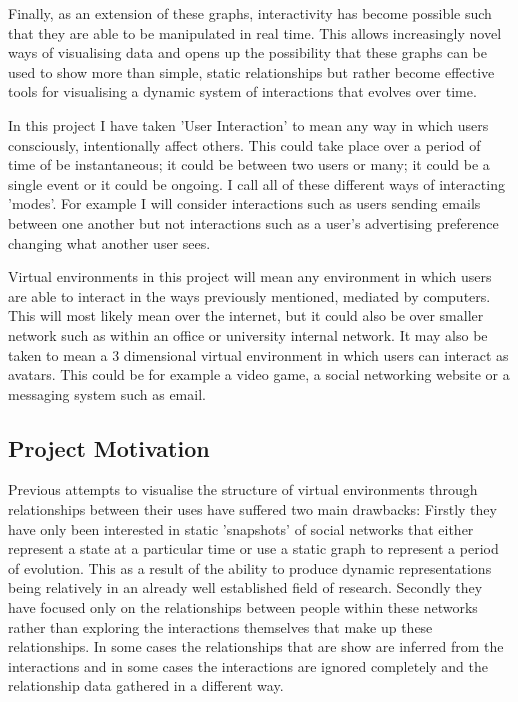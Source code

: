 \documentclass[12pt,a4paper]{article}
\begin{document}
Finally, as an extension of these graphs, interactivity has become possible such that they are able to be manipulated in real time. This allows increasingly novel ways of visualising data and opens up the possibility that these graphs can be used to show more than simple, static relationships but rather become effective tools for visualising a dynamic system of interactions that evolves over time.

In this project I have taken 'User Interaction' to mean any way in which users consciously, intentionally affect others. This could take place over a period of time of be instantaneous; it could be between two users or many; it could be a single event or it could be ongoing. I call all of these different ways of interacting 'modes'. For example I will consider interactions such as users sending emails between one another but not interactions such as a user's advertising preference changing what another user sees.

Virtual environments in this project will mean any environment in which users are able to interact in the ways previously mentioned, mediated by computers. This will most likely mean over the internet, but it could also be over smaller network such as within an office or university internal network. It may also be taken to mean a 3 dimensional virtual environment in which users can interact as avatars. This could be for example a video game, a social networking website or a messaging system such as email.

\subsection{Project Motivation}
\noindent
Previous attempts to visualise the structure of virtual environments through relationships between their uses have suffered two main drawbacks: Firstly they have only been interested in static 'snapshots' of social networks that either represent a state at a particular time or use a static graph to represent a period of evolution. This as a result of the ability to produce dynamic representations being relatively in an already well established field of research. Secondly they have focused only on the relationships between people within these networks rather than exploring the interactions themselves that make up these relationships. In some cases the relationships that are show are inferred from the interactions and in some cases the interactions are ignored completely and the relationship data gathered in a different way.
\end{document}
